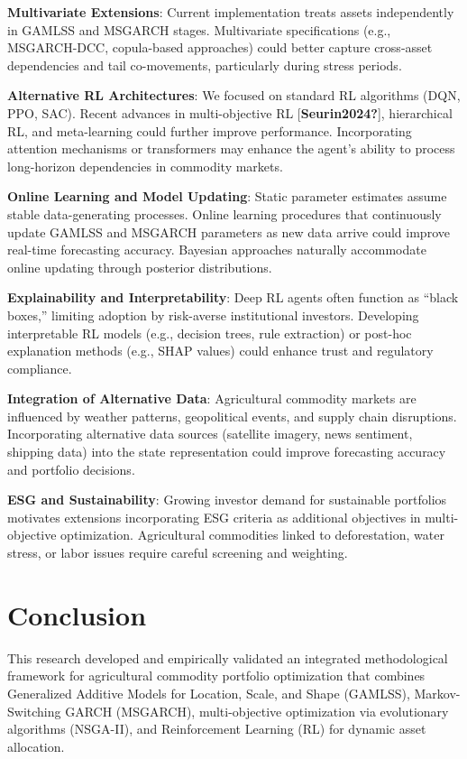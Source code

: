 \documentclass[
  10pt,
  a4paper,
]{article}
\begin{document}
\textbf{Multivariate Extensions}: Current implementation treats assets
independently in GAMLSS and MSGARCH stages. Multivariate specifications
(e.g., MSGARCH-DCC, copula-based approaches) could better capture
cross-asset dependencies and tail co-movements, particularly during
stress periods.

\textbf{Alternative RL Architectures}: We focused on standard RL
algorithms (DQN, PPO, SAC). Recent advances in multi-objective RL
{[}\textbf{Seurin2024?}{]}, hierarchical RL, and meta-learning could
further improve performance. Incorporating attention mechanisms or
transformers may enhance the agent's ability to process long-horizon
dependencies in commodity markets.

\textbf{Online Learning and Model Updating}: Static parameter estimates
assume stable data-generating processes. Online learning procedures that
continuously update GAMLSS and MSGARCH parameters as new data arrive
could improve real-time forecasting accuracy. Bayesian approaches
naturally accommodate online updating through posterior distributions.

\textbf{Explainability and Interpretability}: Deep RL agents often
function as ``black boxes,'' limiting adoption by risk-averse
institutional investors. Developing interpretable RL models (e.g.,
decision trees, rule extraction) or post-hoc explanation methods (e.g.,
SHAP values) could enhance trust and regulatory compliance.

\textbf{Integration of Alternative Data}: Agricultural commodity markets
are influenced by weather patterns, geopolitical events, and supply
chain disruptions. Incorporating alternative data sources (satellite
imagery, news sentiment, shipping data) into the state representation
could improve forecasting accuracy and portfolio decisions.

\textbf{ESG and Sustainability}: Growing investor demand for sustainable
portfolios motivates extensions incorporating ESG criteria as additional
objectives in multi-objective optimization. Agricultural commodities
linked to deforestation, water stress, or labor issues require careful
screening and weighting.

\section{Conclusion}\label{sec-conclusion}

This research developed and empirically validated an integrated
methodological framework for agricultural commodity portfolio
optimization that combines Generalized Additive Models for Location,
Scale, and Shape (GAMLSS), Markov-Switching GARCH (MSGARCH),
multi-objective optimization via evolutionary algorithms (NSGA-II), and
Reinforcement Learning (RL) for dynamic asset allocation.
\end{document}
